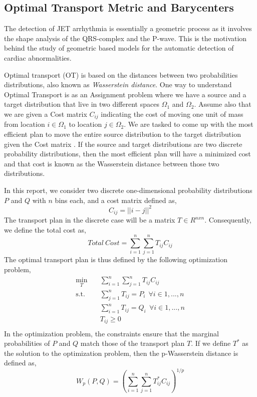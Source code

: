 \documentclass[conference,compsoc]{IEEEtran}
\begin{document}
\subsection{Optimal Transport Metric and Barycenters}
The detection of JET arrhythmia is essentially a geometric process as it involves the shape analysis of the QRS-complex and the P-wave. This is the motivation behind the study of geometric based models for the automatic detection of cardiac abnormalities.

Optimal transport (OT) is based on the distances between two probabilities distributions, also known as\textit{ Wasserstein distance}. One way to understand Optimal Transport is as an Assignment problem where we have a source and a target distribution that live in two different spaces $\Omega_1$ and $\Omega_2$. Assume also that we are given a Cost matrix $C_{ij}$ indicating the cost of moving one unit of mass from location $i \in \Omega_1$ to location $j \in \Omega_2$. We are tasked to come up with the most efficient plan to move the entire source distribution to the target distribution given the Cost matrix \cite{PeyréGabriel2020COT}. If the source and target distributions are two discrete probability distributions, then the most efficient plan will have a minimized cost and that cost is known as the Wasserstein distance between those two distributions. 

In this report, we consider two discrete one-dimensional probability distributions $P$ and $Q$ with $n$ bins each, and a cost matrix defined as,
\begin{equation}
    C_{ij} = ||i - j||^{2}
\end{equation}
The transport plan in the discrete case will be a matrix $T \in {R}^{nxn}$. Consequently, we define the total cost as,
\begin{equation}
    Total\:Cost = \sum_{i=1}^{n} \sum_{j=1}^{n} T_{ij}C_{ij}
\end{equation}
The optimal transport plan is thus defined by the following optimization problem,
\begin{equation}
\begin{aligned}
\min_{T} \quad & \sum_{i=1}^{n} \sum_{j=1}^{n} T_{ij}C_{ij}\\
\textrm{s.t.} \quad & \sum_{j=1}^n T_{ij} = P_i \: \: \forall i \in {1,...,n}\\
& \sum_{i=1}^n T_{ij} = Q_i \: \: \forall i \in {1,...,n}\\
  &T_{ij} \ge 0     \\
\end{aligned}
\end{equation}
In the optimization problem, the constraints ensure that the marginal probabilities of $P$ and $Q$ match those of the transport plan $T$. If we define $T^*$ as the solution to the optimization problem, then the p-Wasserstein distance is defined as,
\begin{equation}
    W_p(P,Q) = (\sum_{i=1}^{n} \sum_{j=1}^{n} T_{ij}^*C_{ij})^{1/p}
\end{equation}
\end{document}
